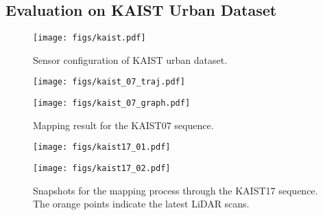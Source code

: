 \documentclass[letterpaper, 10 pt, conference]{ieeeconf}  %
\begin{document}
\subsection{Evaluation on KAIST Urban Dataset}

\begin{figure}[tb]
  \centering
  \texttt{[image: figs/kaist.pdf]}
  \caption{Sensor configuration of KAIST urban dataset.}
  \label{fig:kaist_urban}
\end{figure}

\begin{figure*}[tb]
  \centering
  \begin{minipage}[b]{0.44\linewidth}
  \centering
  \texttt{[image: figs/kaist\_07\_traj.pdf]}
  \end{minipage}
  \begin{minipage}[b]{0.44\linewidth}
  \centering
  \texttt{[image: figs/kaist\_07\_graph.pdf]}
  \end{minipage}
  \caption{Mapping result for the KAIST07 sequence.}
  \label{fig:kaist_07}
\end{figure*}

\begin{figure*}[tb]
  \centering
  \begin{minipage}[b]{0.44\linewidth}
  \centering
  \texttt{[image: figs/kaist17\_01.pdf]}
  \end{minipage}
  \begin{minipage}[b]{0.44\linewidth}
  \centering
  \texttt{[image: figs/kaist17\_02.pdf]}
  \end{minipage}
  \caption{Snapshots for the mapping process through the KAIST17 sequence. The orange points indicate the latest LiDAR scans.}
  \label{fig:kaist_17}
\end{figure*}
\end{document}

